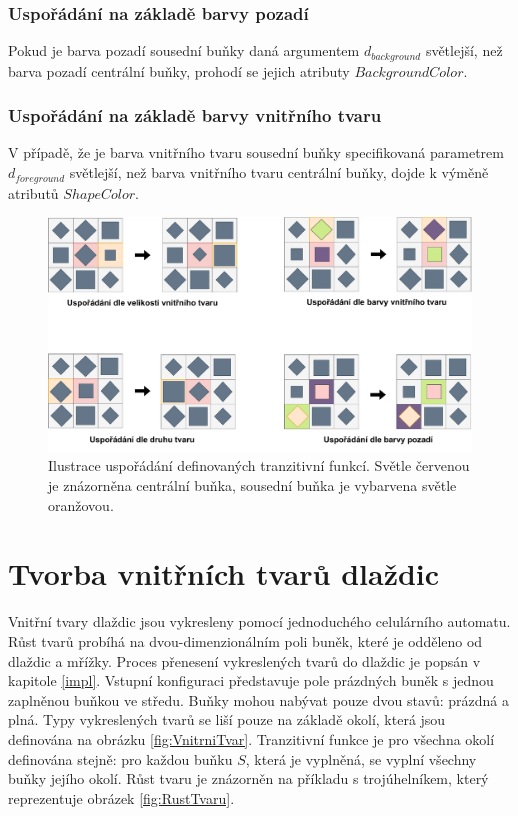 \subsubsection*{Uspořádání na základě barvy pozadí}

Pokud je barva pozadí sousední buňky daná argumentem $d_{background}$ světlejší, než barva pozadí centrální buňky, prohodí se jejich atributy $BackgroundColor$.

\subsubsection*{Uspořádání na základě barvy vnitřního tvaru}

V případě, že je barva vnitřního tvaru sousední buňky specifikovaná parametrem $d_{foreground}$ světlejší, než barva vnitřního tvaru centrální buňky, dojde k výměně atributů $ShapeColor$.

\begin{figure}[H]
    \centering
    \includegraphics[width=\textwidth]{obrazky-figures/Usporadani.pdf}
    \caption{Ilustrace uspořádání definovaných tranzitivní funkcí. Světle červenou je znázorněna centrální buňka, sousední buňka je vybarvena světle oranžovou.}
    \label{fig:usporadani}
\end{figure}

\section{Tvorba vnitřních tvarů dlaždic}
\label{section:GrowingCA}
Vnitřní tvary dlaždic jsou vykresleny pomocí jednoduchého celulárního automatu. Růst tvarů probíhá na dvou-dimenzionálním poli buněk, které je odděleno od dlaždic a mřížky. Proces přenesení vykreslených tvarů do dlaždic je popsán v kapitole \ref{impl}. Vstupní konfiguraci představuje pole prázdných buněk s jednou zaplněnou buňkou ve středu. Buňky mohou nabývat pouze dvou stavů: prázdná a plná. Typy vykreslených tvarů se liší pouze na základě okolí, která jsou definována na obrázku \ref{fig:VnitrniTvar}. Tranzitivní funkce je pro všechna okolí definována stejně: pro každou buňku $S$, která je vyplněná, se vyplní všechny buňky jejího okolí. Růst tvaru je znázorněn na příkladu s trojúhelníkem, který reprezentuje obrázek \ref{fig:RustTvaru}. 

